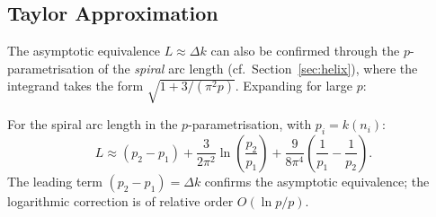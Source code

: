 \subsection{Taylor Approximation}

The asymptotic equivalence $L \approx \Delta k$ can also be confirmed
through the $p$-parametrisation of the \emph{spiral} arc length
(cf.\ Section~\ref{sec:helix}), where the integrand takes the form
$\sqrt{1 + 3/(\pi^2 p)}$. Expanding for large $p$:

\begin{theorem}
\label{thm:taylor}
For the spiral arc length in the $p$-parametrisation, with
$p_i = k(n_i)$:
\begin{equation}\label{eq:taylor}
  L \approx (p_2 - p_1)
  + \frac{3}{2\pi^2}\ln\!\left(\frac{p_2}{p_1}\right)
  + \frac{9}{8\pi^4}\left(\frac{1}{p_1} - \frac{1}{p_2}\right).
\end{equation}
The leading term $(p_2 - p_1) = \Delta k$ confirms the asymptotic
equivalence; the logarithmic correction is of relative order
$O(\ln p / p)$.
\end{theorem}
